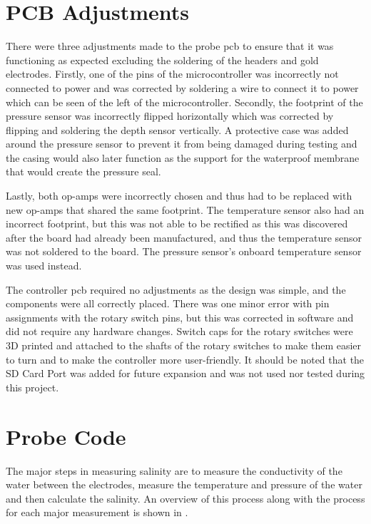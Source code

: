 \section{PCB Adjustments}

There were three adjustments made to the probe \gls{pcb} to ensure that it was functioning as expected excluding the soldering of the headers and gold electrodes.
Firstly, one of the pins of the microcontroller was incorrectly not connected to power and was corrected by soldering a wire to connect it to power which can be seen of the left of the microcontroller.
Secondly, the footprint of the pressure sensor was incorrectly flipped horizontally which was corrected by flipping and soldering the depth sensor vertically.
A protective case was added around the pressure sensor to prevent it from being damaged during testing and the casing would also later function as the support for the waterproof membrane that would create the pressure seal.

Lastly, both op-amps were incorrectly chosen and thus had to be replaced with new op-amps that shared the same footprint.
The temperature sensor also had an incorrect footprint, but this was not able to be rectified as this was discovered after the board had already been manufactured, and thus the temperature sensor was not soldered to the board.
The pressure sensor's onboard temperature sensor was used instead.

The controller \gls{pcb} required no adjustments as the design was simple, and the components were all correctly placed.
There was one minor error with pin assignments with the rotary switch pins, but this was corrected in software and did not require any hardware changes.
Switch caps for the rotary switches were 3D printed and attached to the shafts of the rotary switches to make them easier to turn and to make the controller more user-friendly.
It should be noted that the SD Card Port was added for future expansion and was not used nor tested during this project.

\section{Probe Code}

The major steps in measuring salinity are to measure the conductivity of the water between the electrodes, measure the temperature and pressure of the water and then calculate the salinity.
An overview of this process along with the process for each major measurement is shown in .

